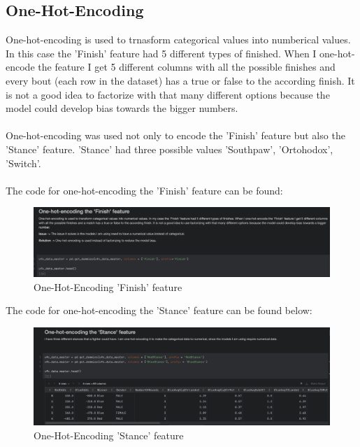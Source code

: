 \documentclass{article}
\begin{document}
 \subsection{One-Hot-Encoding} %
  One-hot-encoding is used to trnasform categorical values into numberical values. In this case the 'Finish' feature had 5 different types of finished. When I one-hot-encode 
  the feature I get 5 different columns with all the possible finishes and every bout (each row in the dataset) has a true or false to the according finish. It is not a good idea 
  to factorize with that many different options because the model could develop bias towards the bigger numbers.\\\\ 
  One-hot-encoding was used not only to encode the 'Finish' feature but also the 'Stance' feature. 'Stance' had three possible values 'Southpaw', 'Ortohodox', 'Switch'.\\\\
  The code for one-hot-encoding the 'Finish' feature can be found:\\
\begin{figure}[H]
	\centering
	\includegraphics[width=1\textwidth]{images/One_hot_encoding_finish.png}
	\caption{One-Hot-Encoding 'Finish' feature}
\end{figure}
  The code for one-hot-encoding the 'Stance' feature can be found below:\\
  \begin{figure}[H]
  	\centering
  	\includegraphics[width=1\textwidth]{images/One_hot_encodiong_Stance.png}
  	\caption{One-Hot-Encoding 'Stance' feature}
  \end{figure}
\end{document}
